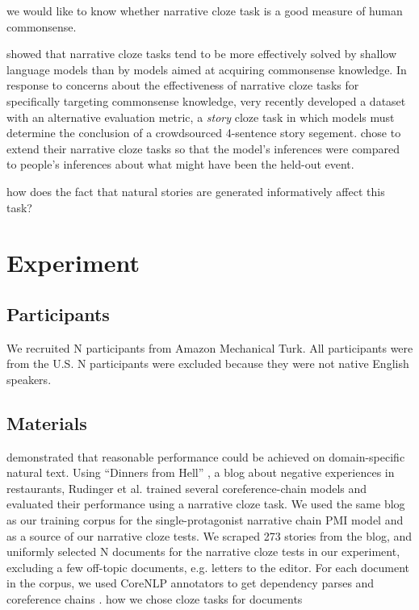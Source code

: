 \documentclass[10pt,a4paper]{article}
\newcommand{\todo}[1]{{\color{red}#1}}
\begin{document}
\todo{ we would like to know whether narrative cloze task is a good measure of human commonsense.}

 showed that narrative cloze tasks tend to be more effectively solved by shallow language models than by models aimed at acquiring commonsense knowledge.
In response to concerns about the effectiveness of narrative cloze tasks for specifically targeting commonsense knowledge,  very recently developed a dataset with an alternative evaluation metric, a {\em story} cloze task in which models must determine the conclusion of a crowdsourced 4-sentence story segement.
 chose to extend their narrative cloze tasks so that the model's inferences were compared to people's inferences about what might have been the held-out event.

\todo{how does the fact that natural stories are generated informatively affect this task? }

\section{Experiment}

\subsection{Participants}

We recruited \todo{N} participants from Amazon Mechanical Turk.
All participants were from the U.S.
\todo{N participants were excluded because they were not native English speakers.}

\subsection{Materials}

 demonstrated that reasonable performance could be achieved on domain-specific natural text.
Using ``Dinners from Hell'' \cite{dinnersfromhell}, a blog about negative experiences in restaurants, Rudinger et al. trained several coreference-chain models and evaluated their performance using a narrative cloze task.
We used the same blog as our training corpus for the single-protagonist narrative chain PMI model and as a source of our narrative cloze tests.
We scraped 273 stories from the blog, and uniformly selected \todo{N} documents for the narrative cloze tests in our experiment, excluding a few off-topic documents, e.g. letters to the editor.
For each document in the corpus, we used CoreNLP annotators \cite{corenlp} to get dependency parses \cite{depparse} and coreference chains \cite{coref2013a, coref2013b, coref2011, coref2010}.
\todo{how we chose cloze tasks for documents}
\end{document}
